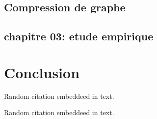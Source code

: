 \documentclass[11pt,a4paper]{report}
\theoremstyle{definition}
\begin{document}
	\chapter{Compression de graphe}
	


	\chapter{chapitre 03: etude empirique}

\part{Conclusion} 


Random citation \citep{seo2018effective} embeddeed in text.

Random citation \citep{brisaboa2009k} embeddeed in text.

\newpage


\end{document}
